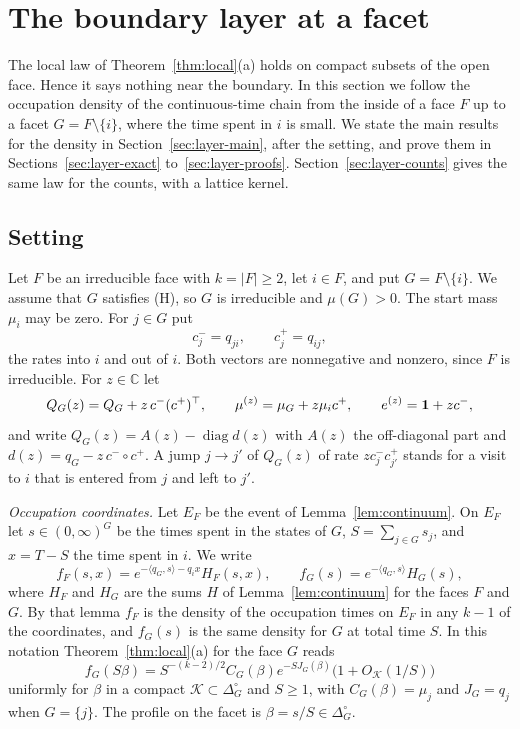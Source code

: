 \section{The boundary layer at a facet}\label{sec:boundary-layer}

The local law of Theorem~\ref{thm:local}(a) holds on compact subsets of the open face. Hence
it says nothing near the boundary. In this section we follow the occupation density of the
continuous-time chain from the inside of a face $F$ up to a facet $G=F\setminus\{i\}$, where the
time spent in $i$ is small. We state the main results for the density in
Section~\ref{sec:layer-main}, after the setting, and prove them in
Sections~\ref{sec:layer-exact} to~\ref{sec:layer-proofs}. Section~\ref{sec:layer-counts} gives
the same law for the counts, with a lattice kernel.

\subsection{Setting}\label{sec:layer-setting}

Let $F$ be an irreducible face with $k=|F|\ge2$, let $i\in F$, and put $G=F\setminus\{i\}$.
We assume that $G$ satisfies (H), so $G$ is irreducible and $\mu(G)>0$. The start mass
$\mu_i$ may be zero. For $j\in G$ put
\[
c^-_j=q_{ji},\qquad c^+_j=q_{ij},
\]
the rates into $i$ and out of $i$. Both vectors are nonnegative and nonzero, since $F$ is
irreducible. For $z\in\mathbb C$ let
\[
Q_G(z)=Q_G+z\,c^-(c^+)^\top,\qquad \mu^{(z)}=\mu_G+z\mu_ic^+,\qquad e^{(z)}=\mathbf{1}+zc^- ,
\]
and write $Q_G(z)=A(z)-\operatorname{diag}d(z)$ with $A(z)$ the off-diagonal part and
$d(z)=q_G-z\,c^-\circ c^+$. A jump $j\to j'$ of $Q_G(z)$ of rate $zc^-_jc^+_{j'}$ stands for a
visit to $i$ that is entered from $j$ and left to $j'$.

\emph{Occupation coordinates.} Let $E_F$ be the event of Lemma~\ref{lem:continuum}. On $E_F$
let $s\in(0,\infty)^G$ be the times spent in the states of $G$, $S=\sum_{j\in G}s_j$, and
$x=T-S$ the time spent in $i$. We write
\[
f_F(s,x)=e^{-\langle q_G,s\rangle-q_ix}H_F(s,x),\qquad f_G(s)=e^{-\langle q_G,s\rangle}H_G(s),
\]
where $H_F$ and $H_G$ are the sums $H$ of Lemma~\ref{lem:continuum} for the faces $F$ and $G$.
By that lemma $f_F$ is the density of the occupation times on $E_F$ in any $k-1$ of the
coordinates, and $f_G(s)$ is the same density for $G$ at total time $S$. In this
notation Theorem~\ref{thm:local}(a) for the face $G$ reads
\begin{equation}\label{eq:layer-local-G}
f_G(S\beta)=S^{-(k-2)/2}C_G(\beta)e^{-SJ_G(\beta)}\bigl(1+O_{\mathcal K}(1/S)\bigr)
\end{equation}
uniformly for $\beta$ in a compact $\mathcal K\subset\Delta_G^\circ$ and $S\ge1$, with
$C_G(\beta)=\mu_j$ and $J_G=q_j$ when $G=\{j\}$. The profile on the facet is
$\beta=s/S\in\Delta_G^\circ$.

